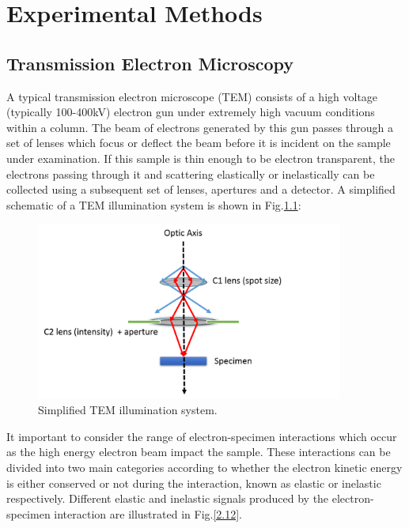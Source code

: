 
\chapter{Experimental Methods}

\section{Transmission Electron Microscopy}
\label{TEM}
A typical transmission electron microscope   (TEM) consists of a high voltage (typically 100-400kV) electron gun under extremely high vacuum conditions within a column. The beam of electrons generated by this gun passes through a set of lenses which focus or deflect the beam before it is incident on the sample under examination. If this sample is thin enough to be electron transparent, the electrons passing through it and scattering elastically or inelastically can be collected using a subsequent set of lenses, apertures and a detector. A simplified schematic of a TEM illumination system is shown in Fig.\ref{2.11}:

\begin{figure}[!ht]
	\centering
	\includegraphics[width=0.9\textwidth]{Figs/Ch2/illum.png}
	\caption[h] {Simplified TEM illumination system.}
	\label{2.11}
\end{figure}

\FloatBarrier 

It important to consider the range of electron-specimen interactions which occur as the high energy electron beam impact the sample. These interactions can be divided into two main categories according to whether the electron kinetic energy is either conserved or not during the interaction, known as elastic or inelastic respectively. Different elastic and inelastic signals produced by the electron-specimen interaction are illustrated in Fig.\ref{2.12}.

